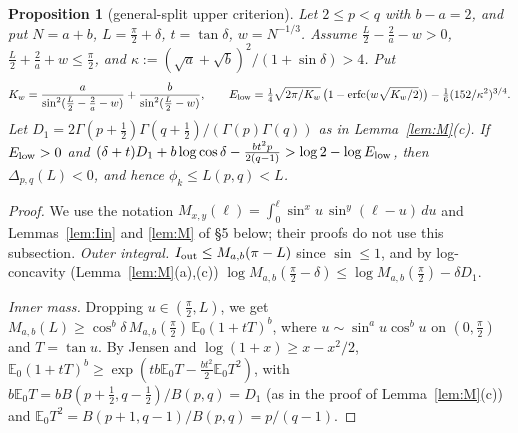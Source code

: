 \documentclass[11pt]{amsart}
\newtheorem{proposition}[theorem]{Proposition}
\theoremstyle{definition}
\begin{document}
\begin{proposition}[general-split upper criterion]\label{prop:upgen}
Let $2\le p<q$ with $b-a=2$, and put $N=a+b$, $L=\frac\pi2+\delta$, $t=\tan\delta$, $w=N^{-1/3}$. Assume
$\frac L2-\frac2a-w>0$, $\frac L2+\frac2a+w\le\frac\pi2$, and $\kappa:=(\sqrt a+\sqrt b)^2/(1+\sin\delta)>4$. Put
\[
K_w=\frac a{\sin^2(\frac L2-\frac2a-w)}+\frac b{\sin^2(\frac L2-w)},\qquad
E_{\rm low}=\tfrac14\sqrt{2\pi/K_w}\,\big(1-\operatorname{erfc}(w\sqrt{K_w/2})\big)-\tfrac16(152/\kappa^2)^{3/4}.
\]
Let $D_1=2\Gamma(p+\frac12)\Gamma(q+\frac12)/(\Gamma(p)\Gamma(q))$ as in Lemma~\ref{lem:M}(c). If $E_{\rm low}>0$ and
$(\delta+t)D_1+b\log\cos\delta-\frac{bt^2p}{2(q-1)}>\log2-\log E_{\rm low}$, then $\Delta_{p,q}(L)<0$, and hence $\phi_k\le L(p,q)<L$.
\end{proposition}
\begin{proof}
We use the notation $M_{x,y}(\ell)=\int_0^\ell\sin^xu\,\sin^y(\ell-u)\,du$ and Lemmas~\ref{lem:Iin} and \ref{lem:M} of \S5 below; their proofs do not use
this subsection.
\emph{Outer integral.} $I_{\rm out}\le M_{a,b}(\pi-L)$ since $\sin\le1$, and by log-concavity (Lemma~\ref{lem:M}(a),(c))
$\log M_{a,b}(\frac\pi2-\delta)\le\log M_{a,b}(\frac\pi2)-\delta D_1$.

\emph{Inner mass.} Dropping $u\in(\frac\pi2,L)$, we get $M_{a,b}(L)\ge\cos^b\delta\,M_{a,b}(\frac\pi2)\,\mathbb E_0(1+tT)^b$, where
$u\sim\sin^au\cos^bu$ on $(0,\frac\pi2)$ and $T=\tan u$. By Jensen and $\log(1+x)\ge x-x^2/2$,
$\mathbb E_0(1+tT)^b\ge\exp(tb\mathbb E_0T-\frac{bt^2}2\mathbb E_0T^2)$, with $b\mathbb E_0T=bB(p+\frac12,q-\frac12)/B(p,q)=D_1$ (as in the proof of
Lemma~\ref{lem:M}(c)) and $\mathbb E_0T^2=B(p+1,q-1)/B(p,q)=p/(q-1)$.


\end{proof}
\end{document}
